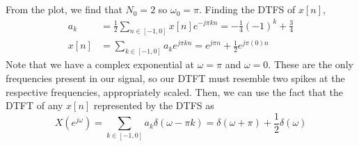 \documentclass{article}
\begin{document}
\subsection{}

From the plot, we find that \(N_0 = 2\) so \(\omega_0 = \pi\).
Finding the DTFS of \(x[n]\),
\begin{align}
    a_k &= \frac{1}{2} \sum_{n \in [-1, 0]} x[n] e^{-j \pi k n} = -\frac{1}{4} (-1)^k + \frac{3}{4} \\
    x[n] &= \sum_{k \in [-1, 0]} a_k e^{j \pi k n} = e^{j \pi n} + \frac{1}{2} e^{j \pi (0) n}
\end{align}
Note that we have a complex exponential at \(\omega = \pi\) and \(\omega = 0\).
These are the only frequencies present in our signal, so our DTFT must resemble two spikes at the respective frequencies, appropriately scaled.
Then, we can use the fact that the DTFT of any \(x[n]\) represented by the DTFS as
\begin{equation}
    X(e^{j \omega}) = \sum_{k \in [-1, 0]} a_k \delta(\omega - \pi k) = \delta(\omega + \pi) + \frac{1}{2} \delta(\omega)
\end{equation}
\end{document}
